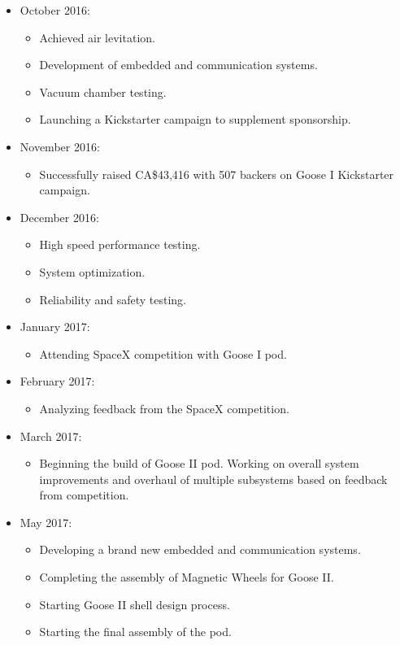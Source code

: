 \documentclass[main.tex]{subfiles}
\begin{document}
\begin{flushleft}
\begin{itemize}
\item October 2016:
\begin{itemize}
    \item Achieved air levitation.
    \item Development of embedded and communication systems.
    \item Vacuum chamber testing.
    \item Launching a Kickstarter campaign to supplement sponsorship.
\end{itemize}

\item November 2016:
\begin{itemize}
    \item Successfully raised CA\$43,416 with 507 backers on Goose I Kickstarter campaign.
\end{itemize}

\item December 2016:
\begin{itemize}
    \item High speed performance testing.
    \item System optimization.
    \item Reliability and safety testing.
\end{itemize}

\item January 2017:
\begin{itemize}
    \item Attending SpaceX competition with Goose I pod.
\end{itemize}

\item February 2017:
\begin{itemize}
    \item Analyzing feedback from the SpaceX competition.
\end{itemize}

\item March 2017:
\begin{itemize}
    \item Beginning the build of Goose II pod. Working on overall system improvements and overhaul of multiple subsystems based on feedback from competition.
\end{itemize}

\item May 2017:
\begin{itemize}
    \item Developing a brand new embedded and communication systems.
    \item Completing the assembly of Magnetic Wheels for Goose II.
    \item Starting Goose II shell design process.
    \item Starting the final assembly of the pod.
\end{itemize}


\end{itemize}
\end{flushleft}
\end{document}
